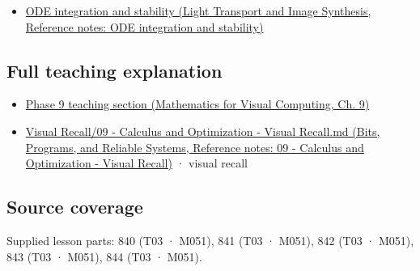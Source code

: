\begin{itemize}
\tightlist
\item
  \href{../04-Light-Transport-and-Image-Synthesis/main.pdf\#nameddest=appendix-18eacf61a04b}{ODE integration and stability (Light Transport and Image Synthesis, Reference notes: ODE integration and stability)}
\end{itemize}

\subsection{Full teaching explanation}\label{appendix-8f96f9c4d5bc-full-teaching-explanation}

\begin{itemize}
\tightlist
\item
  \href{../02-Mathematics-for-Visual-Computing/main.pdf\#nameddest=02-foundations-ii-ch025-odes-and-numerical-simulation}{Phase 9 teaching section (Mathematics for Visual Computing, Ch. 9)}
\item
  \href{../01-Bits-Programs-and-Reliable-Systems/main.pdf\#nameddest=appendix-adf48f5dc5c1}{Visual Recall/09 - Calculus and Optimization - Visual Recall.md (Bits, Programs, and Reliable Systems, Reference notes: 09 - Calculus and Optimization - Visual Recall)} · visual recall
\end{itemize}

\subsection{Source coverage}\label{appendix-8f96f9c4d5bc-source-coverage}

Supplied lesson parts: 840 (T03 · M051), 841 (T03 · M051), 842 (T03 · M051), 843 (T03 · M051), 844 (T03 · M051).
